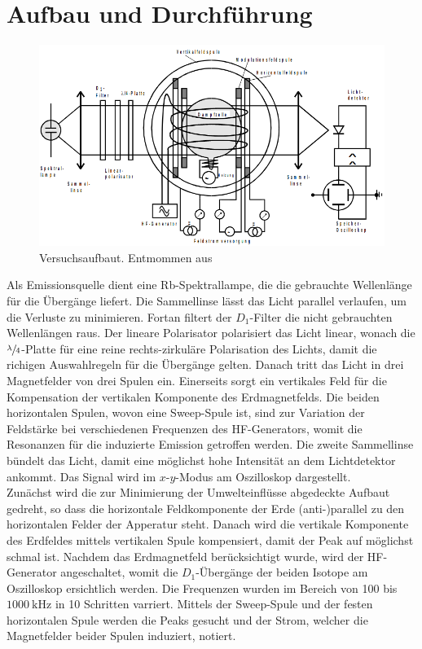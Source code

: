 \section{Aufbau und Durchführung}
\label{sec:Durchführung}
\begin{figure}
    \centering
    \includegraphics[width = 0.9 \textwidth]{pics/Aufbau.png}
    \caption{Versuchsaufbaut.
    Entmommen aus \cite{sample}}
    \label{fig:Ficken}
\end{figure}
Als Emissionsquelle dient eine Rb-Spektrallampe, die die gebrauchte Wellenlänge für die Übergänge liefert.
Die Sammellinse lässt das Licht parallel verlaufen, um die Verluste zu minimieren.
Fortan filtert der $D_1$-Filter die nicht gebrauchten Wellenlängen raus.
Der lineare Polarisator polarisiert das Licht linear, wonach die $\sfrac{\lambda}{4}$-Platte 
für eine reine rechts-zirkuläre Polarisation des Lichts, damit die richigen Auswahlregeln für die Übergänge gelten.
Danach tritt das Licht in drei Magnetfelder von drei Spulen ein. 
Einerseits sorgt ein vertikales Feld für die Kompensation der vertikalen Komponente des Erdmagnetfelds.
Die beiden horizontalen Spulen, wovon eine Sweep-Spule ist, sind zur Variation der Feldstärke bei verschiedenen 
Frequenzen des HF-Generators, womit die Resonanzen für die induzierte Emission getroffen werden.
Die zweite Sammellinse bündelt das Licht, damit eine möglichst hohe Intensität an dem Lichtdetektor ankommt.
Das Signal wird im $x\text{-}y$-Modus am Oszilloskop dargestellt.\\
Zunächst wird die zur Minimierung der Umwelteinflüsse abgedeckte Aufbaut gedreht, so dass die horizontale Feldkomponente der Erde (anti-)parallel zu den horizontalen Felder 
der Apperatur steht. 
Danach wird die vertikale Komponente des Erdfeldes mittels vertikalen Spule kompensiert, damit
der Peak auf möglichst schmal ist.
Nachdem das Erdmagnetfeld berücksichtigt wurde, wird der HF-Generator angeschaltet, womit die $D_1$-Übergänge der beiden Isotope
am Oszilloskop ersichtlich werden.
Die  Frequenzen wurden im Bereich von 100 bis $\qty{1000}{\kilo\hertz}$ in 10 Schritten varriert.
Mittels der Sweep-Spule und der festen horizontalen Spule werden die Peaks gesucht und der Strom, welcher die Magnetfelder beider Spulen induziert, notiert.
